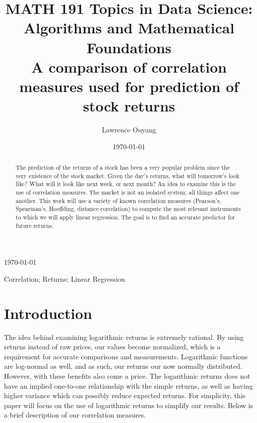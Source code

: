 \documentclass[10pt]{siamltex}
\begin{document}
\title{MATH 191 Topics in Data Science: \\ Algorithms and Mathematical Foundations \\ A comparison of correlation measures used for prediction of stock returns }
\author{Lawrence Ouyang}
\date{\today}
\maketitle

\begin{center}
     \today
\end{center}

\vspace{5mm}

\begin{abstract}
The prediction of the returns of a stock has been a very popular problem since the very existence of the stock market. Given the day's returns, what will tomorrow's look like? What will it look like next week, or next month? An idea to examine this is the use of correlation measures. The market is not an isolated system; all things affect one another. This work will use a variety of known correlation measures (Pearson's, Spearman's, Hoeffding, distance correlation) to compute the most relevant instruments to which we will apply linear regression. The goal is to find an accurate predictor for future returns. 
\end{abstract}


\begin{keywords} Correlation; Returns; Linear Regression
\end{keywords}


\section{Introduction}

The idea behind examining logarithmic returns is extremely rational. By using returns instead of raw prices, our values become normalized, which is a requirement for accurate comparisons and measurements. Logarithmic functions are log-normal as well, and as such, our returns our now normally distributed. However, with these benefits also come a price. The logarithmic returns does not have an implied one-to-one relationship with the simple returns, as well as having higher variance which can possibly reduce expected returns\cite{CompLogSimRet}. For simplicity, this paper will focus on the use of logarithmic returns to simplify our results. Below is a brief description of our correlation measures.
\end{document}
